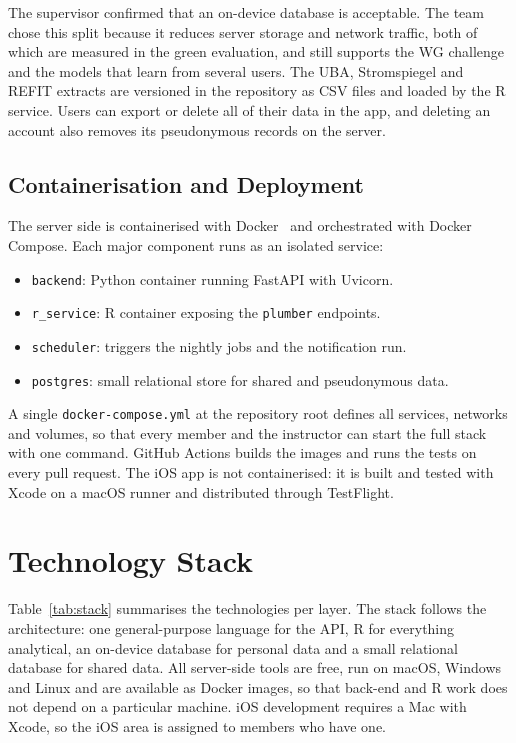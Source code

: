 \documentclass[conference]{IEEEtran}
\newcommand{\pkg}[1]{\texttt{#1}}
\begin{document}
The supervisor confirmed that an on-device database is acceptable. The team chose this split because it reduces server storage and network traffic, both of which are measured in the green evaluation, and still supports the WG challenge and the models that learn from several users. The UBA, Stromspiegel and REFIT extracts are versioned in the repository as CSV files and loaded by the R service. Users can export or delete all of their data in the app, and deleting an account also removes its pseudonymous records on the server.

\subsection{Containerisation and Deployment}
The server side is containerised with Docker~\cite{docker} and orchestrated with Docker Compose. Each major component runs as an isolated service:
\begin{itemize}
\item \texttt{backend}: Python container running FastAPI with Uvicorn.
\item \texttt{r\_service}: R container exposing the \pkg{plumber} endpoints.
\item \texttt{scheduler}: triggers the nightly jobs and the notification run.
\item \texttt{postgres}: small relational store for shared and pseudonymous data.
\end{itemize}
A single \texttt{docker-compose.yml} at the repository root defines all services, networks and volumes, so that every member and the instructor can start the full stack with one command. GitHub Actions builds the images and runs the tests on every pull request. The iOS app is not containerised: it is built and tested with Xcode on a macOS runner and distributed through TestFlight.

\section{Technology Stack}
Table~\ref{tab:stack} summarises the technologies per layer. The stack follows the architecture: one general-purpose language for the API, R for everything analytical, an on-device database for personal data and a small relational database for shared data. All server-side tools are free, run on macOS, Windows and Linux and are available as Docker images, so that back-end and R work does not depend on a particular machine. iOS development requires a Mac with Xcode, so the iOS area is assigned to members who have one.
\end{document}
